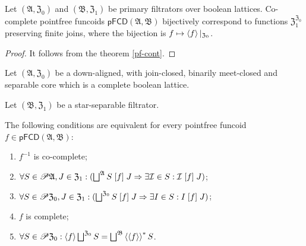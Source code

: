 \begin{prop}
Let $(\mathfrak{A},\mathfrak{Z}_{0})$ and $(\mathfrak{B},\mathfrak{Z}_{1})$
be primary filtrators over boolean lattices. Co-complete pointfree
funcoids $\mathsf{pFCD}(\mathfrak{A},\mathfrak{B})$ bijectively correspond
to functions $\mathfrak{Z}_{1}^{\mathfrak{Z}_{0}}$ preserving finite
joins, where the bijection is $f\mapsto\left\langle f\right\rangle|_{\mathfrak{Z}_{0}}$.\end{prop}
\begin{proof}
It follows from the theorem \ref{pf-cont}.\end{proof}
\begin{thm}
\label{pf-compl-conds}Let $(\mathfrak{A},\mathfrak{Z}_0)$ be a down-aligned,
with join-closed, binarily meet-closed and separable core which is
a complete boolean lattice.

Let $(\mathfrak{B},\mathfrak{Z}_{1})$ be a star-separable filtrator.

The following conditions are equivalent for every pointfree funcoid
$f\in\mathsf{pFCD}(\mathfrak{A},\mathfrak{B})$:
\begin{enumerate}
\item \label{pf-ax:fcd-full-main}$f^{-1}$ is co-complete;
\item \label{pf-ax:fcd-full-fa-filt}$\forall S\in\mathscr{P}\mathfrak{A},J\in\mathfrak{Z}_{1}:(\bigsqcup^{\mathfrak{A}}S\suprel fJ\Rightarrow\exists\mathcal{I}\in S:\mathcal{I}\suprel fJ)$;
\item \label{pf-ax:fcd-full-fa-set}$\forall S\in\mathscr{P}\mathfrak{Z}_{0},J\in\mathfrak{Z}_{1}:(\bigsqcup^{\mathfrak{Z}_{0}}S\suprel fJ\Rightarrow\exists I\in S:I\suprel fJ)$;
\item \label{pf-ax:fcd-full-eq-filt}$f$ is complete;
\item \label{pf-ax:fcd-full-eq-set}$\forall S\in\mathscr{P}\mathfrak{Z}_{0}:\supfun f\bigsqcup^{\mathfrak{Z}_{0}}S=\bigsqcup^{\mathfrak{B}}\rsupfun{\supfun f}S$.
\end{enumerate}
\end{thm}
